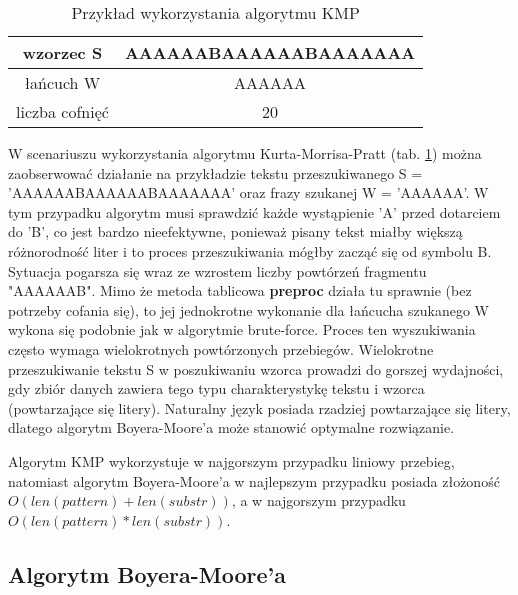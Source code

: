 \begin{table}
  \centering
  \begin{tabular}{ |c|c|  } 
    \hline
    wzorzec S & AAAAAABAAAAAABAAAAAAA \\
    \hline
    łańcuch W & AAAAAA \\
    \hline
    liczba cofnięć & 20 \\
    \hline
  \end{tabular}
  \caption{Przykład wykorzystania algorytmu KMP}
  \label{tabela:KMPExampleSlow}
\end{table}

W scenariuszu wykorzystania algorytmu Kurta-Morrisa-Pratt (tab. \ref{tabela:KMPExampleSlow})
można zaobserwować działanie na przykładzie tekstu przeszukiwanego S = 
'AAAAAABAAAAAABAAAAAAA' oraz frazy szukanej W = 'AAAAAA'. W tym przypadku algorytm musi sprawdzić każde
wystąpienie 'A' przed dotarciem do 'B', co jest bardzo nieefektywne, ponieważ
pisany tekst miałby większą różnorodność liter i to proces przeszukiwania mógłby 
zacząć się od symbolu B. Sytuacja 
pogarsza się wraz ze wzrostem liczby powtórzeń fragmentu "AAAAAAB". Mimo że 
metoda tablicowa \textbf{preproc} działa tu sprawnie (bez potrzeby cofania się), to jej 
jednokrotne wykonanie dla łańcucha szukanego W wykona się podobnie jak w algorytmie
brute-force. Proces ten wyszukiwania często wymaga wielokrotnych powtórzonych przebiegów. 
Wielokrotne przeszukiwanie tekstu S w poszukiwaniu wzorca prowadzi do gorszej
wydajności, gdy zbiór danych zawiera tego typu 
charakterystykę tekstu i wzorca (powtarzające się litery). Naturalny język posiada
rzadziej powtarzające się litery, dlatego algorytm Boyera-Moore'a może stanowić 
optymalne rozwiązanie.

Algorytm KMP wykorzystuje w najgorszym przypadku liniowy przebieg, natomiast
algorytm Boyera-Moore'a w najlepszym przypadku posiada złożoność $O({len(pattern)}+{len(substr)})$, a w 
najgorszym przypadku $O({len(pattern)}*{len(substr)})$.

\subsection{Algorytm Boyera-Moore'a}
\label{sch:algoBoyerMoore}

